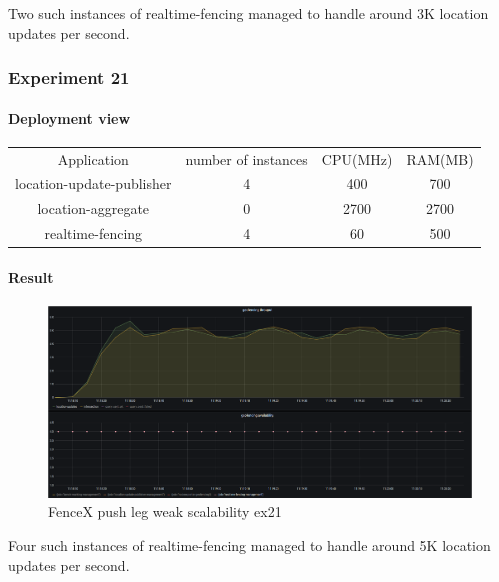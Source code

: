 \documentclass[a4]{report}
\begin{document}
        Two such instances of realtime-fencing managed to handle around 3K location updates per second.

        \clearpage

        \subsubsection{Experiment 21}

        \paragraph{Deployment view}
        \begin{center}
            \begin{tabular}{ c c c c }
                Application               & number of instances & CPU(MHz) & RAM(MB) \\
                location-update-publisher & 4                   & 400      & 700     \\
                location-aggregate        & 0                   & 2700     & 2700    \\
                realtime-fencing          & 4                   & 60       & 500     \\
            \end{tabular}
        \end{center}

        \paragraph{Result}
        \begin{figure}[ht]
            \caption{FenceX push leg weak scalability ex21}
            \label{fig:ex21}
            \includegraphics[scale=0.4]{images/evaluation/ex21-benchmarking-ongoing-1per6sec.png}
        \end{figure}
        Four such instances of realtime-fencing managed to handle around 5K location updates per second.
\end{document}
